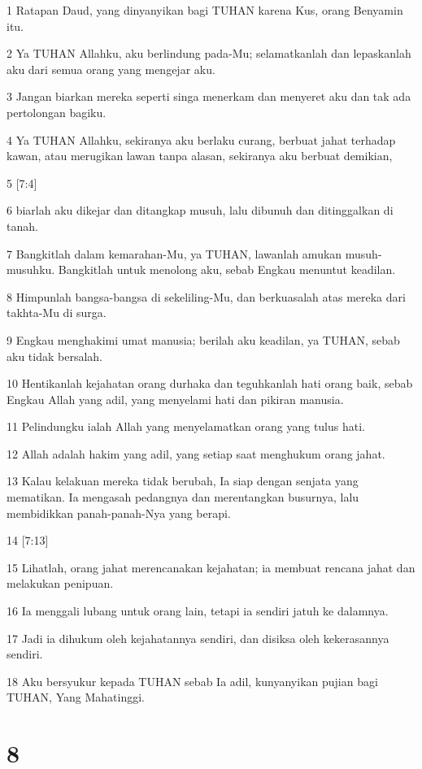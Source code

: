 \par 1 Ratapan Daud, yang dinyanyikan bagi TUHAN karena Kus, orang Benyamin itu.
\par 2 Ya TUHAN Allahku, aku berlindung pada-Mu; selamatkanlah dan lepaskanlah aku dari semua orang yang mengejar aku.
\par 3 Jangan biarkan mereka seperti singa menerkam dan menyeret aku dan tak ada pertolongan bagiku.
\par 4 Ya TUHAN Allahku, sekiranya aku berlaku curang, berbuat jahat terhadap kawan, atau merugikan lawan tanpa alasan, sekiranya aku berbuat demikian,
\par 5 [7:4]
\par 6 biarlah aku dikejar dan ditangkap musuh, lalu dibunuh dan ditinggalkan di tanah.
\par 7 Bangkitlah dalam kemarahan-Mu, ya TUHAN, lawanlah amukan musuh-musuhku. Bangkitlah untuk menolong aku, sebab Engkau menuntut keadilan.
\par 8 Himpunlah bangsa-bangsa di sekeliling-Mu, dan berkuasalah atas mereka dari takhta-Mu di surga.
\par 9 Engkau menghakimi umat manusia; berilah aku keadilan, ya TUHAN, sebab aku tidak bersalah.
\par 10 Hentikanlah kejahatan orang durhaka dan teguhkanlah hati orang baik, sebab Engkau Allah yang adil, yang menyelami hati dan pikiran manusia.
\par 11 Pelindungku ialah Allah yang menyelamatkan orang yang tulus hati.
\par 12 Allah adalah hakim yang adil, yang setiap saat menghukum orang jahat.
\par 13 Kalau kelakuan mereka tidak berubah, Ia siap dengan senjata yang mematikan. Ia mengasah pedangnya dan merentangkan busurnya, lalu membidikkan panah-panah-Nya yang berapi.
\par 14 [7:13]
\par 15 Lihatlah, orang jahat merencanakan kejahatan; ia membuat rencana jahat dan melakukan penipuan.
\par 16 Ia menggali lubang untuk orang lain, tetapi ia sendiri jatuh ke dalamnya.
\par 17 Jadi ia dihukum oleh kejahatannya sendiri, dan disiksa oleh kekerasannya sendiri.
\par 18 Aku bersyukur kepada TUHAN sebab Ia adil, kunyanyikan pujian bagi TUHAN, Yang Mahatinggi.

\chapter{8}

